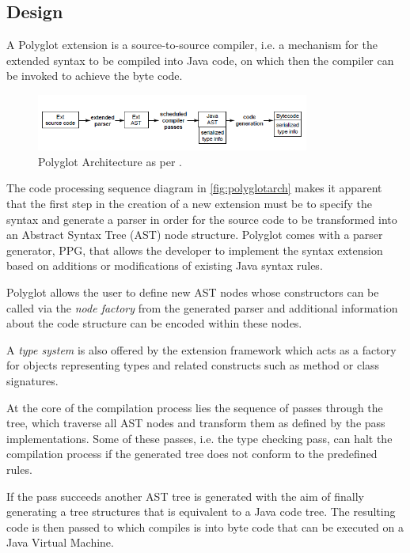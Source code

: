 \subsection{Design}
\label{subsec:polyglotarch}
A Polyglot extension is a source-to-source compiler, i.e. a mechanism for the extended syntax to be compiled into Java code, on which then the  compiler can be invoked to achieve the byte code.

\begin{figure}[htb]
\begin{center}
\includegraphics[width=0.8\textwidth]{polyglotarch.png}
\caption{Polyglot Architecture as per \cite{polyglotpaper}.}
\label{fig:polyglotarch}
\end{center}
\end{figure} 

The code processing sequence diagram in \autoref{fig:polyglotarch} makes it apparent that the first step in the creation of a new extension must be to specify the syntax and generate a parser in order for the source code to be transformed into an Abstract Syntax Tree (AST) node structure. Polyglot comes with a parser generator, PPG, that allows the developer to implement the syntax extension based on additions or modifications of existing Java syntax rules\cite{polyglotpaper}.

Polyglot allows the user to define new AST nodes whose constructors can be called via the \textit{node factory} from the generated parser and additional information about the code structure can be encoded within these nodes. 

A \textit{type system} is also offered by the extension framework which acts as a factory for objects representing types and related constructs such as method or class signatures\cite{polyglotpaper}.

At the core of the compilation process lies the sequence of passes through the tree, which traverse all AST nodes and transform them as defined by the pass implementations. Some of these passes, i.e. the type checking pass, can halt the compilation process if the generated tree does not conform to the predefined rules. 

If the pass succeeds another AST tree is generated with the aim of finally generating a tree structures that is equivalent to a Java code tree. The resulting code is then passed to  which compiles is into byte code that can be executed on a Java Virtual Machine.

